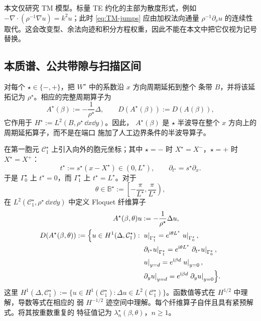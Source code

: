 \begin{remark}[TE 极化]
本文仅研究 TM 模型。标量 TE 约化的主部为散度形式，例如 $-\nabla\cdot(\rho^{-1}\nabla u)=k^2u$；此时 \eqref{eq:TM-jumps} 应由加权法向通量 $\rho^{-1}\partial_\nu u$ 的连续性取代。这会改变型、余法向迹和积分方程权重，因此不能在本文中把它仅视为记号替换。
\end{remark}

\subsection{本质谱、公共带隙与扫描区间}

对每个 $\star\in\{-,+\}$，把 $W^\star$ 中的系数沿 $x$ 方向周期延拓到整个
条带 $B$，并将该延拓记为 $\rho^\star$。相应的完整周期算子为
\begin{equation}
  A^\star(\beta):=-\frac{1}{\rho^\star}\Delta,\qquad
  D(A^\star(\beta)):=D(A(\beta)),
  \label{eq:background-operators}
\end{equation}
它作用于 $H^\star:=L^2(B,\rho^\star\,\dd x\dd y)$。因此，
$A^\star(\beta)$ 是 $\star$ 半波导在整个 $x$ 方向上的周期延拓算子，而不是在端口
施加了人工边界条件的半波导算子。

在第一胞元 $\mathcal C_1^\star$ 上引入向外的胞元坐标；其中 $\star=-$ 时
$X^\star=X^-$，$\star=+$ 时 $X^\star=X^+$：
\[
  t^\star:=s^\star(x-X^\star)\in(0,L^\star),
  \qquad \partial_{t^\star}=s^\star\partial_x.
\]
于是 $\Gamma_0^\star$ 上 $t^\star=0$，而 $\Gamma_1^\star$ 上
$t^\star=L^\star$。对于
\[
  \theta\in\mathbb B^\star
  :=\left[-\frac{\pi}{L^\star},\frac{\pi}{L^\star}\right),
\]
在 $L^2(\mathcal C_1^\star,\rho^\star\,\dd x\dd y)$ 中定义 Floquet 纤维算子
\[
\begin{aligned}
  A^\star(\beta,\theta)u
  &:=-\frac{1}{\rho^\star}\Delta u,\\
  D(A^\star(\beta,\theta))
  :=\Bigl\{u\in H^1(\Delta,\mathcal C_1^\star):{}&
  \left.u\right|_{\Gamma_1^\star}
    =e^{\mathrm{i}\theta L^\star}\left.u\right|_{\Gamma_0^\star},\\
  &\left.\partial_{t^\star}u\right|_{\Gamma_1^\star}
    =e^{\mathrm{i}\theta L^\star}
      \left.\partial_{t^\star}u\right|_{\Gamma_0^\star},\\
  &\left.u\right|_{y=d}
    =e^{\mathrm{i}\beta d}\left.u\right|_{y=0},\\
  &\left.\partial_yu\right|_{y=d}
    =e^{\mathrm{i}\beta d}\left.\partial_yu\right|_{y=0}
  \Bigr\}.
\end{aligned}
\]
这里
$H^1(\Delta,\mathcal C_1^\star)
:=\{u\in H^1(\mathcal C_1^\star):\Delta u\in
L^2(\mathcal C_1^\star)\}$。函数值等式在 $H^{1/2}$ 中理解，导数等式在相应的
弱 $H^{-1/2}$ 迹空间中理解。每个纤维算子自伴且具有紧预解式。将其按重数重复的
特征值记为 $\lambda_n^\star(\beta,\theta)$，$n\geq1$。

